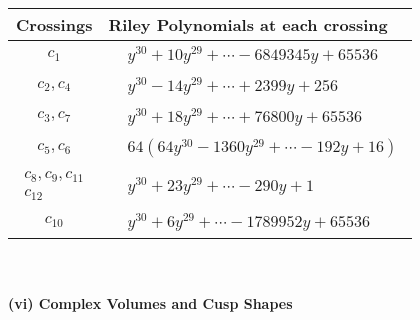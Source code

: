 \documentclass[1p]{elsarticle_modified}
\theoremstyle{definition}
\begin{document}
\begin{tabular}{m{50pt}|m{274pt}}
Crossings & \hspace{64pt}Riley Polynomials at each crossing \\
\hline $$\begin{aligned}c_{1}\end{aligned}$$&$\begin{aligned}
&y^{30}+10 y^{29}+\cdots-6849345 y+65536
\end{aligned}$\\
\hline $$\begin{aligned}c_{2},c_{4}\end{aligned}$$&$\begin{aligned}
&y^{30}-14 y^{29}+\cdots+2399 y+256
\end{aligned}$\\
\hline $$\begin{aligned}c_{3},c_{7}\end{aligned}$$&$\begin{aligned}
&y^{30}+18 y^{29}+\cdots+76800 y+65536
\end{aligned}$\\
\hline $$\begin{aligned}c_{5},c_{6}\end{aligned}$$&$\begin{aligned}
&64(64 y^{30}-1360 y^{29}+\cdots-192 y+16)
\end{aligned}$\\
\hline $$\begin{aligned}c_{8},c_{9},c_{11}\\c_{12}\end{aligned}$$&$\begin{aligned}
&y^{30}+23 y^{29}+\cdots-290 y+1
\end{aligned}$\\
\hline $$\begin{aligned}c_{10}\end{aligned}$$&$\begin{aligned}
&y^{30}+6 y^{29}+\cdots-1789952 y+65536
\end{aligned}$\\
\hline
\end{tabular}\\~\\
\newpage\flushleft \textbf{(vi) Complex Volumes and Cusp Shapes}
\end{document}
